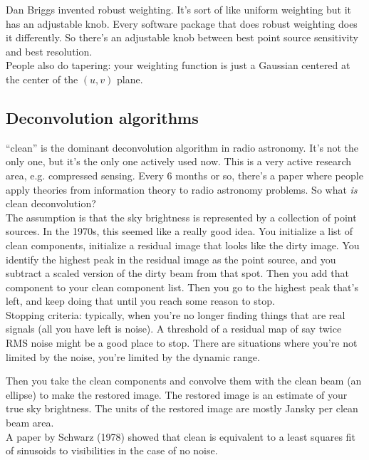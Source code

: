 \documentclass[a4paper]{article}
\begin{document}
Dan Briggs invented robust weighting. It's sort of like uniform weighting but it has an adjustable knob. Every software package that does robust weighting does it differently. So there's an adjustable knob between best point source sensitivity and best resolution. \\

People also do tapering: your weighting function is just a Gaussian centered at the center of the $(u,v)$ plane. 

\subsection{Deconvolution algorithms}

``clean'' is the dominant deconvolution algorithm in radio astronomy. It's not the only one, but it's the only one actively used now. This is a very active research area, e.g. compressed sensing. Every 6 months or so, there's a paper where people apply theories from information theory to radio astronomy problems. So what \emph{is} clean deconvolution? \\

The assumption is that the sky brightness is represented by a collection of point sources. In the 1970s, this seemed like a really good idea. You initialize a list of clean components, initialize a residual image that looks like the dirty image. You identify the highest peak in the residual image as the point source, and you subtract a scaled version of the dirty beam from that spot. Then you add that component to your clean component list. Then you go to the highest peak that's left, and keep doing that until you reach some reason to stop. \\

Stopping criteria: typically, when you're no longer finding things that are real signals (all you have left is noise). A threshold of a residual map of say twice RMS noise might be a good place to stop. There are situations where you're not limited by the noise, you're limited by the dynamic range. 

Then you take the clean components and convolve them with the clean beam (an ellipse) to make the restored image. The restored image is an estimate of your true sky brightness. The units of the restored image are mostly Jansky per clean beam area. \\

A paper by Schwarz (1978) showed that clean is equivalent to a least squares fit of sinusoids to visibilities in the case of no noise. \\
\end{document}
